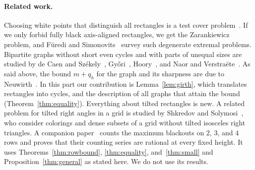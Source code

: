 \paragraph{Related work.} Choosing white points that distinguish all rectangles is a test
cover problem~\cite{debontridder2003}. If we only forbid fully black axis-aligned
rectangles, we get the Zarankiewicz problem, and F\"uredi and
Simonovits~\cite{furedisimonovits2013} survey such degenerate extremal problems. Bipartite
graphs without short even cycles and with parts of unequal sizes are studied by de Caen and
Sz\'ekely~\cite{decaenszekely1997}, Gy\H{o}ri~\cite{gyori1997},
Hoory~\cite{hoory2002}, and Naor and Verstra\"ete~\cite{naorverstraete2005}. As said
above, the bound $m+q_h$ for the graph and its sharpness are due to
Neuwirth~\cite{neuwirth2001}. In this part our contribution is Lemma~\ref{lem:girth},
which translates rectangles into cycles, and the description of all graphs that attain the
bound (Theorem~\ref{thm:equality}). Everything about tilted rectangles is new. A related
problem for tilted right angles in a grid is studied by Shkredov and
Solymosi~\cite{shkredovsolymosi2021}, who consider colorings and dense subsets of a grid
without tilted isosceles right triangles. A companion paper~\cite{companion} counts the
maximum blackouts on 2, 3, and 4 rows and proves that their counting series are rational
at every fixed height. It uses Theorems~\ref{thm:rowbound}, \ref{thm:equality},
and~\ref{thm:small} and Proposition~\ref{thm:general} as stated here. We do not use its
results.

